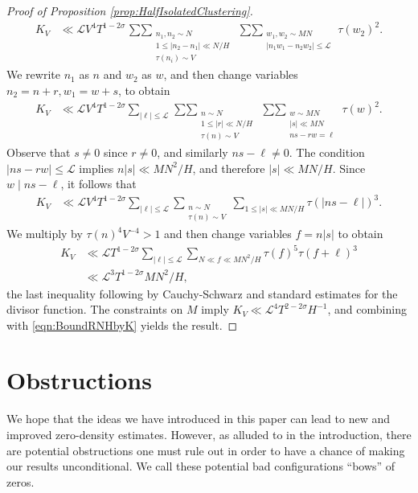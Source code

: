 \documentclass[12pt]{amsart}
\theoremstyle{plain}
\theoremstyle{definition}
\theoremstyle{remark}
\begin{document}
\begin{proof}[Proof of Proposition \ref{prop:HalfIsolatedClustering}]
\begin{align*}
K_V &\ll \mathcal{L} V^4 T^{1-2\sigma} \mathop{\sum\sum}_{\substack{n_1,n_2 \sim N \\ 1\leq |n_2-n_1| \ll N/H \\ \tau(n_i) \sim V}} \mathop{\sum\sum}_{\substack{w_1,w_2 \sim MN \\ |n_1w_1 - n_2w_2| \leq \mathcal{L}}} \tau(w_2)^2.
\end{align*}
We rewrite $n_1$ as $n$ and $w_2$ as $w$, and then change variables $n_2 = n+r, w_1 = w+s$, to obtain
\begin{align*}
K_V &\ll \mathcal{L} V^4 T^{1-2\sigma}\sum_{|\ell|\leq \mathcal{L}} \mathop{\sum\sum}_{\substack{n \sim N \\ 1\leq |r| \ll N/H \\ \tau(n) \sim V}} \mathop{\sum\sum}_{\substack{w \sim MN \\ |s|\ll MN \\ ns - rw =\ell}}\tau(w)^2.
\end{align*}
Observe that $s \neq 0$ since $r\neq 0$, and similarly $ns-\ell \neq 0$. The condition $|ns-rw| \leq \mathcal{L}$ implies $n|s| \ll MN^2/H$, and therefore $|s| \ll MN/H$. Since $w \mid ns-\ell$, it follows that
\begin{align*}
K_V &\ll \mathcal{L} V^4 T^{1-2\sigma}\sum_{|\ell|\leq\mathcal{L}} \sum_{\substack{n\sim N \\ \tau(n)\sim V}} \sum_{1\leq |s| \ll MN/H} \tau(|ns-\ell|)^3.
\end{align*}
We multiply by $\tau(n)^4 V^{-4} > 1$ and then change variables $f = n|s|$ to obtain
\begin{align*}
K_V &\ll \mathcal{L}  T^{1-2\sigma}\sum_{|\ell| \leq \mathcal{L}}\sum_{N \ll f\ll MN^2/H}\tau(f)^5 \tau(f+\ell)^3 \\
&\ll \mathcal{L}^3 T^{1-2\sigma} MN^2/H,
\end{align*}
the last inequality following by Cauchy-Schwarz and standard estimates for the divisor function. The constraints on $M$ imply $K_V \ll \mathcal{L}^4 T^{2-2\sigma} H^{-1}$, and combining with \eqref{eqn:BoundRNHbyK} yields the result.
\end{proof}
%
%
%
%
\section{Obstructions}\label{sec:Bows}
%
%
%
%
We hope that the ideas we have introduced in this paper can lead to new and improved zero-density estimates. However, as alluded to in the introduction, there are potential obstructions one must rule out in order to have a chance of making our results unconditional. We call these potential bad configurations ``bows'' of zeros. 
\end{document}
